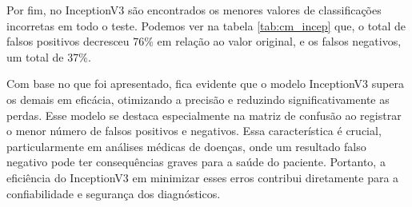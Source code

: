 Por fim, no InceptionV3 são encontrados os menores valores de classificações incorretas em todo o teste. Podemos ver na tabela \ref{tab:cm_incep} que, o total de falsos positivos decresceu 76\% em relação ao valor original, e os falsos negativos, um total de 37\%.

Com base no que foi apresentado, fica evidente que o modelo InceptionV3 supera os demais em eficácia, otimizando a precisão e reduzindo significativamente as perdas. Esse modelo se destaca especialmente na matriz de confusão ao registrar o menor número de falsos positivos e negativos. Essa característica é crucial, particularmente em análises médicas de doenças, onde um resultado falso negativo pode ter consequências graves para a saúde do paciente. Portanto, a eficiência do InceptionV3 em minimizar esses erros contribui diretamente para a confiabilidade e segurança dos diagnósticos.
